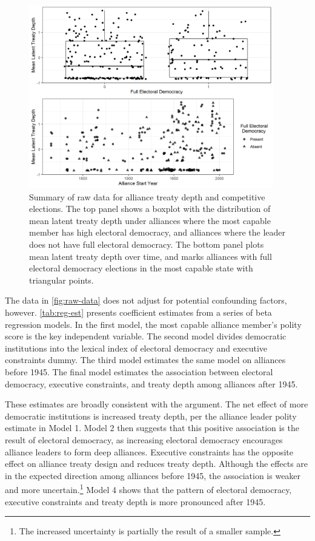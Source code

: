 \documentclass[12pt]{article}
\begin{document}
\begin{figure}[hbtp]
\centering
\includegraphics[width=0.95\textwidth]{../figures/raw-data.png}
\caption{Summary of raw data for alliance treaty depth and competitive elections. The top panel shows a boxplot with the distribution of mean latent treaty depth under alliances where the most capable member has high electoral democracy, and alliances where the leader does not have full electoral democracy. The bottom panel plots mean latent treaty depth over time, and marks alliances with full electoral democracy elections in the most capable state with triangular points. }
\label{fig:raw-data}
\end{figure}


The data in \autoref{fig:raw-data} does not adjust for potential confounding factors, however. 
\autoref{tab:reg-est} presents coefficient estimates from a series of beta regression models. 
In the first model, the most capable alliance member's polity score is the key independent variable. 
The second model divides democratic institutions into the lexical index of electoral democracy and executive constraints dummy.  
The third model estimates the same model on alliances before 1945. 
The final model estimates the association between electoral democracy, executive constraints, and treaty depth among alliances after 1945. 


These estimates are broadly consistent with the argument. 
The net effect of more democratic institutions is increased treaty depth, per the alliance leader polity estimate in Model 1. 
Model 2 then suggests that this positive association is the result of electoral democracy, as increasing electoral democracy encourages alliance leaders to form deep alliances. 
Executive constraints has the opposite effect on alliance treaty design and reduces treaty depth. 
Although the effects are in the expected direction among alliances before 1945, the association is weaker and more uncertain.\footnote{The increased uncertainty is partially the result of a smaller sample.} 
Model 4 shows that the pattern of electoral democracy, executive constraints and treaty depth is more pronounced after 1945. 
\end{document}
